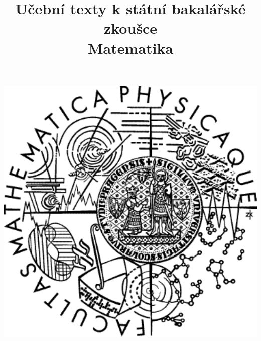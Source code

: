 \clearpage

\clearpage

\title{\LARGE Učební texty k státní bakalářské zkoušce \\ Matematika}




\maketitle

\vspace{10mm}
\begin{center}
\includegraphics[scale=0.5]{../common/logo.pdf}
\end{center} 

\clearpage

\clearpage

\tableofcontents


\newpage

\newpage

\newpage

\newpage

\newpage

\newpage

\newpage

\newpage

\newpage

\newpage

\newpage

\newpage

\newpage

\newpage

\newpage

\newpage

\newpage



